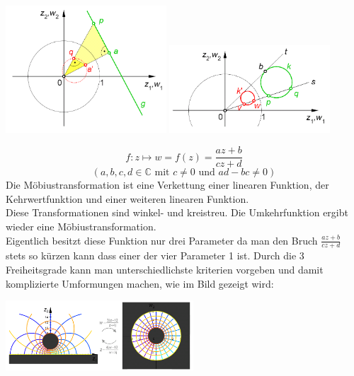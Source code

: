   \hspace{2cm}
  \begin{minipage}{6cm}
    \includegraphics[width=6cm]{./bilder/GeradeKreisspiegelung.png} 
      \includegraphics[width=6cm]{./bilder/KreisKreisspiegelung.png}
    \end{minipage}

  \begin{minipage}{10cm}
    $$ f : z \mapsto w = f(z) = \frac{az + b}{cz + d}$$
    $$(a, b, c, d \in 
    \mathbb{C} \text{ mit } c \neq 0 \text{ und } ad - bc \neq 0) $$
    Die Möbiustransformation ist eine Verkettung einer linearen Funktion, der Kehrwertfunktion und einer weiteren linearen Funktion. \\
    Diese Transformationen sind winkel- und kreistreu. Die Umkehrfunktion ergibt wieder eine Möbiustransformation. \\
    Eigentlich besitzt diese Funktion nur drei Parameter da man den Bruch
    $\frac{az + b}{cz + d}$ stets so kürzen kann dass einer der vier Parameter 1
    ist. Durch die 3 Freiheitsgrade kann man unterschiedlichste kriterien
    vorgeben und damit komplizierte Umformungen machen, wie im Bild gezeigt wird:
  
  \end{minipage}
  \hspace{2cm}
  \begin{minipage}{7cm}
    \includegraphics[width=7cm]{./bilder/Moebiustransformation.png} 
  \end{minipage}

